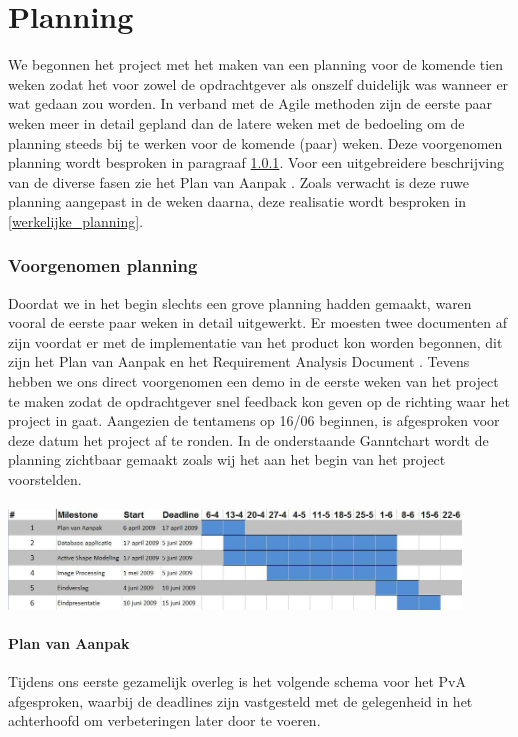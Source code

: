 \chapter{Planning}
\label{Planning}
We begonnen het project met het maken van een planning voor de komende tien
weken zodat het voor zowel de opdrachtgever als onszelf duidelijk was wanneer
er wat gedaan zou worden. In verband met de Agile methoden zijn de eerste paar
weken meer in detail gepland dan de latere weken met de bedoeling om de
planning steeds bij te werken voor de komende (paar) weken. Deze voorgenomen
planning wordt besproken in paragraaf \ref{voorgenomen_planning}. Voor een
uitgebreidere beschrijving van de diverse fasen zie het Plan van Aanpak \pageref{PvA}. 
Zoals verwacht is deze ruwe planning aangepast in de
weken daarna, deze realisatie wordt besproken in \ref{werkelijke_planning}.

\subsection{Voorgenomen planning}
\label{voorgenomen_planning}
Doordat we in het begin slechts een grove planning hadden gemaakt, waren vooral
de eerste paar weken in detail uitgewerkt. Er moesten twee documenten af zijn
voordat er met de implementatie van het product kon worden begonnen, dit zijn
het Plan van Aanpak \pageref{PvA} en het Requirement Analysis Document \pageref{RAD}. Tevens
hebben we ons direct voorgenomen een demo in de eerste weken van het project te
maken zodat de opdrachtgever snel feedback kon geven op de richting waar het
project in gaat.
Aangezien de tentamens op 16/06 beginnen, is afgesproken
voor deze datum het project af te ronden. In de onderstaande Ganntchart wordt
de planning zichtbaar gemaakt zoals wij het aan het begin van het project
voorstelden.
\\
\\
\includegraphics[width=0.9\textwidth]{ganntbefore}

\subsubsection{Plan van Aanpak}
Tijdens ons eerste gezamelijk overleg is het volgende schema voor het PvA
afgesproken, waarbij de deadlines zijn vastgesteld met de gelegenheid in het achterhoofd om 
verbeteringen later door te voeren.

